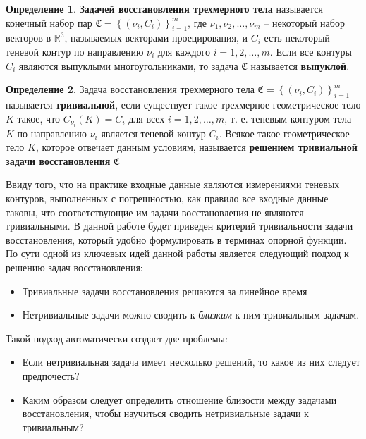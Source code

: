 \documentclass[a4paper, 12pt, titlepage]{article}
\theoremstyle{definition}
\newtheorem{SmartDefinition}{Определение}
\theoremstyle{plain}
\theoremstyle{plain}
\begin{document}
\begin{SmartDefinition}
 \textbf{Задачей восстановления трехмерного тела} называется конечный набор пар
 $\mathfrak{C} = \left\{(\nu_{i}, C_{i})\right\}_{i = 1}^{m}$, где $\nu_{1},
 \nu_{2}, \ldots, \nu_{m}$ -- некоторый набор векторов в $\mathbb{R}^{3}$,
 называемых векторами проецирования, и $C_{i}$ есть некоторый теневой контур 
 по направлению $\nu_{i}$ для каждого $i = 1, 2, \ldots, m$.
 Если все контуры $C_{i}$ являются выпуклыми многоугольниками, то задача
 $\mathfrak{C}$ называется \textbf{выпуклой}.
\end{SmartDefinition}

\begin{SmartDefinition}
 Задача восстановления трехмерного тела
 $\mathfrak{C} = \left\{(\nu_{i}, C_{i})\right\}_{i = 1}^{m}$ называется
 \textbf{тривиальной}, если существует такое трехмерное геометрическое тело $K$
 такое, что $C_{\nu_{i}}(K) = C_{i}$ для всех $i = 1, 2, \ldots, m$, т. е.
 теневым контуром тела $K$ по направлению $\nu_{i}$ является теневой контур
 $C_{i}$. Всякое такое геометрическое тело $K$, которое отвечает данным
 условиям, называется \textbf{решением тривиальной задачи восстановления}
 $\mathfrak{C}$
\end{SmartDefinition}

Ввиду того, что на практике входные данные являются измерениями теневых
контуров, выполненных с погрешностью, как правило все входные данные таковы,
что соответствующие им задачи восстановления не являются тривиальными. В данной
работе будет приведен критерий тривиальности задачи восстановления, который
удобно формулировать в терминах опорной функции. По сути одной из ключевых идей
данной работы является следующий подход к решению задач восстановления:

\begin{itemize}
 \item Тривиальные задачи восстановления решаются за линейное время
 \item Нетривиальные задачи можно сводить к \textit{близким} к ним тривиальным
 задачам.
\end{itemize}

Такой подход автоматически создает две проблемы:

\begin{itemize}
 \item Если нетривиальная задача имеет несколько решений, то какое из них
 следует предпочесть?
 \item Каким образом следует определить отношение близости между задачами
 восстановления, чтобы научиться сводить нетривиальные задачи к тривиальным?
\end{itemize}
\end{document}
